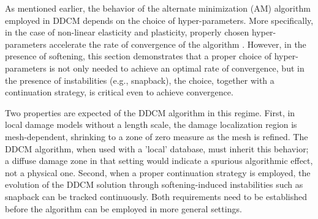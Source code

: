 \documentclass[10pt]{cas-sc}
\newenvironment{addedblock}{}{}
\begin{document}
\begin{addedblock}
As mentioned earlier, the behavior of the alternate minimization (AM) algorithm employed in DDCM depends on the choice of hyper-parameters. More specifically, in the case of non-linear elasticity and plasticity, properly chosen hyper-parameters accelerate the rate of convergence of the algorithm \cite{Nguyen2022,Pham2023}. However, in the presence of softening, this section demonstrates that a proper choice of hyper-parameters is not only needed to achieve an optimal rate of convergence, but in the presence of instabilities (e.g., snapback), the choice, together with a continuation strategy, is critical even to achieve convergence.

Two properties are expected of the DDCM algorithm in this regime. First, in local damage models without a length scale, the damage localization region is mesh-dependent, shrinking to a zone of zero measure as the mesh is refined. The DDCM algorithm, when used with a 'local' database, must inherit this behavior; a diffuse damage zone in that setting would indicate a spurious algorithmic effect, not a physical one. Second, when a proper continuation strategy is employed, the evolution of the DDCM solution through softening-induced instabilities such as snapback can be tracked continuously. Both requirements need to be established before the algorithm can be employed in more general settings.





\end{addedblock}
\end{document}
